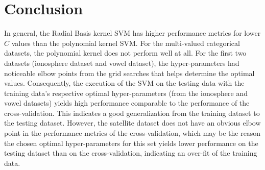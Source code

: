 \documentclass[tikz]{article}
\begin{document}
\section{Conclusion}
\label{sec:conclusion}
In general, the Radial Basis kernel SVM has higher performance metrics for lower $C$ values than the polynomial kernel SVM. For the multi-valued categorical datasets, the polynomial kernel does not perform well at all. For the first two datasets (ionosphere dataset and vowel dataset), the hyper-parameters had noticeable elbow points from the grid searches that helps determine the optimal values. Consequently, the execution of the SVM on the testing data with the training data's respective optimal hyper-parameters (from the ionosphere and vowel datasets) yields high performance comparable to the performance of the cross-validation. This indicates a good generalization from the training dataset to the testing dataset. However, the satellite dataset does not have an obvious elbow point in the performance metrics of the cross-validation, which may be the reason the chosen optimal hyper-parameters for this set yields lower performance on the testing dataset than on the cross-validation, indicating an over-fit of the training data.
\end{document}

